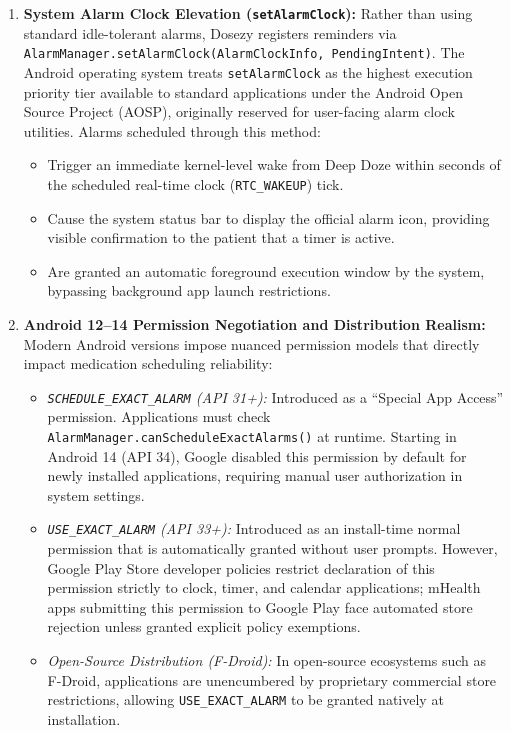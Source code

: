 \documentclass[11pt,a4paper]{article}
\begin{document}
\begin{enumerate}[leftmargin=*]
    \item \textbf{System Alarm Clock Elevation (\texttt{setAlarmClock}):} Rather than using standard idle-tolerant alarms, Dosezy registers reminders via \texttt{AlarmManager.setAlarmClock(AlarmClockInfo, PendingIntent)}. The Android operating system treats \texttt{setAlarmClock} as the highest execution priority tier available to standard applications under the Android Open Source Project (AOSP), originally reserved for user-facing alarm clock utilities. Alarms scheduled through this method:
    \begin{itemize}
        \item Trigger an immediate kernel-level wake from Deep Doze within seconds of the scheduled real-time clock (\texttt{RTC\_WAKEUP}) tick.
        \item Cause the system status bar to display the official alarm icon, providing visible confirmation to the patient that a timer is active.
        \item Are granted an automatic foreground execution window by the system, bypassing background app launch restrictions.
    \end{itemize}
    \item \textbf{Android 12--14 Permission Negotiation and Distribution Realism:} Modern Android versions impose nuanced permission models that directly impact medication scheduling reliability:
    \begin{itemize}
        \item \emph{\texttt{SCHEDULE\_EXACT\_ALARM} (API 31+):} Introduced as a ``Special App Access'' permission. Applications must check \texttt{AlarmManager.canScheduleExactAlarms()} at runtime. Starting in Android 14 (API 34), Google disabled this permission by default for newly installed applications, requiring manual user authorization in system settings.
        \item \emph{\texttt{USE\_EXACT\_ALARM} (API 33+):} Introduced as an install-time normal permission that is automatically granted without user prompts. However, Google Play Store developer policies restrict declaration of this permission strictly to clock, timer, and calendar applications; mHealth apps submitting this permission to Google Play face automated store rejection unless granted explicit policy exemptions.
        \item \emph{Open-Source Distribution (F-Droid):} In open-source ecosystems such as F-Droid, applications are unencumbered by proprietary commercial store restrictions, allowing \texttt{USE\_EXACT\_ALARM} to be granted natively at installation.

\end{itemize}
\end{enumerate}
\end{document}
